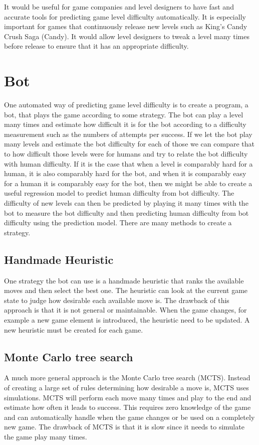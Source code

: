 \documentclass{kththesis}
\begin{document}
It would be useful for game companies and level designers to have fast and accurate tools for predicting game level difficulty automatically. It is especially important for games that continuously release new levels such as King's Candy Crush Saga (Candy). It would allow level designers to tweak a level many times before release to ensure that it has an appropriate difficulty. 

\section{Bot}
One automated way of predicting game level difficulty is to create a program, a bot, that plays the game according to some strategy. The bot can play a level many times and estimate how difficult it is for the bot according to a difficulty measurement such as the numbers of attempts per success. If we let the bot play many levels and estimate the bot difficulty for each of those we can compare that to how difficult those levels were for humans and try to relate the bot difficulty with human difficulty.  If it is the case that when a level is comparably hard for a human, it is also comparably hard for the bot, and when it is comparably easy for a human it is comparably easy for the bot, then we might be able to create a useful regression model to predict human difficulty from bot difficulty. The difficulty of new levels can then be predicted by playing it many times with the bot to measure the bot difficulty and then predicting human difficulty from bot difficulty using the prediction model. There are many methods to create a strategy.

\subsection{Handmade Heuristic}
One strategy the bot can use is a handmade heuristic that ranks the available moves and then select the best one. The heuristic can look at the current game state to judge how desirable each available move is. The drawback of this approach is that it is not general or maintainable. When the game changes, for example a new game element is introduced, the heuristic need to be updated. A new heuristic must be created for each game.

\subsection{Monte Carlo tree search}
A much more general approach is the Monte Carlo tree search (MCTS). Instead of creating a large set of rules determining how desirable a move is, MCTS uses simulations. MCTS will perform each move many times and play to the end and estimate how often it leads to success. This requires zero knowledge of the game and can automatically handle when the game changes or be used on a completely new game. The drawback of MCTS is that it is slow since it needs to simulate the game play many times.
\end{document}

